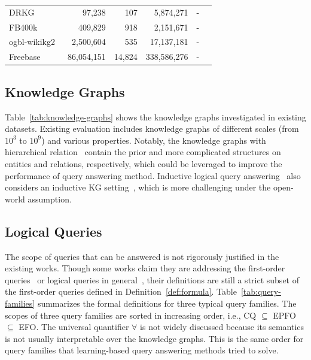 \documentclass[11pt]{article}
\begin{document}
\begin{table}[t]
\begin{tabular}{lrrrrr}
		DRKG~\cite{Zhang2021Drugrepurposing} & 97,238 & 107 & 5,874,271 & - & \cite{Choudhary2021ProbabilisticEntity} \\
        FB400k~\cite{Talmor2018WebKnowledgeBase,Bollacker2008Freebasecollaboratively} & 409,829 & 918 & 2,151,671 & - & \cite{Ren2022SMOREKnowledgea} \\
		ogbl-wikikg2~\cite{Hu2020OpenGraph} & 2,500,604 & 535 & 17,137,181 & - & \cite{Ren2022SMOREKnowledgea,Galkin2022InductiveLogical} \\
		Freebase~\cite{Bollacker2008Freebasecollaboratively} & 86,054,151 & 14,824 & 338,586,276 & - & \cite{Ren2022SMOREKnowledgea} \\
		\bottomrule
	\end{tabular}
\end{table}

\subsection{Knowledge Graphs} Table~\ref{tab:knowledge-graphs} shows the knowledge graphs investigated in existing datasets. Existing evaluation includes knowledge graphs of different scales (from $10^3$ to $10^9$) and various properties. Notably, the knowledge graphs with hierarchical relation~\cite{Miller1995WordNetlexical,Auer2007DBpediaNucleus} contain the prior and more complicated structures on entities and relations, respectively, which could be leveraged to improve the performance of query answering method.
Inductive logical query answering~\cite{Galkin2022InductiveLogical} also considers an inductive
KG setting~\cite{Teru2020InductiveRelation}, which is more challenging under the open-world assumption.

\subsection{Logical Queries} The scope of queries that can be answered is not rigorously justified in the existing works. Though some works claim they are addressing the first-order queries~\cite{Ren2020BetaEmbeddings} or logical queries in general~\cite{Liu2021NeuralAnsweringLogical}, their definitions are still a strict subset of the first-order queries defined in Definition~\ref{def:formula}.
Table~\ref{tab:query-families} summarizes the formal definitions for three typical query families. The scopes of three query families are sorted in increasing order, i.e., CQ $\subseteq$ EPFO $\subseteq$ EFO. The universal quantifier $\forall$ is not widely discussed because its semantics is not usually interpretable over the knowledge graphs. This is the same order for query families that learning-based query answering methods tried to solve.
\end{document}
